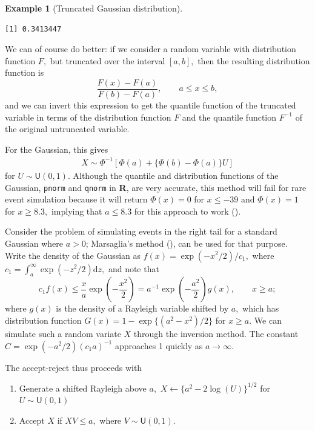 \documentclass[
  11pt,
  letterpaper,
]{scrbook}
\providecommand{\tightlist}{%
  \setlength{\itemsep}{0pt}\setlength{\parskip}{0pt}}
\theoremstyle{definition}
\newtheorem{example}{Example}[chapter]
\theoremstyle{plain}
\theoremstyle{plain}
\theoremstyle{plain}
\theoremstyle{definition}
\theoremstyle{definition}
\theoremstyle{plain}
\theoremstyle{plain}
\theoremstyle{remark}
\begin{document}
\begin{example}[Truncated Gaussian
distribution]
\begin{verbatim}
[1] 0.3413447
\end{verbatim}

We can of course do better: if we consider a random variable with
distribution function \(F,\) but truncated over the interval \([a,b],\)
then the resulting distribution function is
\[\frac{F(x) - F(a)}{F(b)-F(a)}, \qquad a \leq x \leq b,\] and we can
invert this expression to get the quantile function of the truncated
variable in terms of the distribution function \(F\) and the quantile
function \(F^{-1}\) of the original untruncated variable.

For the Gaussian, this gives \begin{align*}
X \sim \Phi^{-1}\left[\Phi(a) + \{\Phi(b)-\Phi(a)\}U\right]
\end{align*} for \(U \sim \mathsf{U}(0,1).\) Although the quantile and
distribution functions of the Gaussian, \texttt{pnorm} and
\texttt{qnorm} in \textbf{R}, are very accurate, this method will fail
for rare event simulation because it will return \(\Phi(x) = 0\) for
\(x \leq -39\) and \(\Phi(x)=1\) for \(x \geq 8.3,\) implying that
\(a \leq 8.3\) for this approach to work
().

Consider the problem of simulating events in the right tail for a
standard Gaussian where \(a > 0\); Marsaglia's method
(), can be used for that
purpose. Write the density of the Gaussian as
\(f(x) = \exp(-x^2/2)/c_1,\) where
\(c_1 = \int_{a}^{\infty}\exp(-z^2/2)\mathrm{d} z,\) and note that
\[c_1f(x) \leq \frac{x}{a}\exp\left(-\frac{x^2}{2}\right)= a^{-1}\exp\left(-\frac{a^2}{2}\right)g(x), \qquad x \geq a;\]
where \(g(x)\) is the density of a Rayleigh variable shifted by \(a,\)
which has distribution function \(G(x) = 1-\exp\{(a^2-x^2)/2\}\) for
\(x \geq a.\) We can simulate such a random variate \(X\) through the
inversion method. The constant \(C= \exp(-a^2/2)(c_1a)^{-1}\) approaches
1 quickly as \(a \to \infty.\)

The accept-reject thus proceeds with

\begin{enumerate}
\def\labelenumi{\arabic{enumi}.}
\tightlist
\item
  Generate a shifted Rayleigh above \(a,\)
  \(X \gets  \{a^2 - 2\log(U)\}^{1/2}\) for \(U \sim \mathsf{U}(0,1)\)
\item
  Accept \(X\) if \(XV \leq a,\) where \(V \sim \mathsf{U}(0,1).\)
\end{enumerate}


\end{example}
\end{document}
